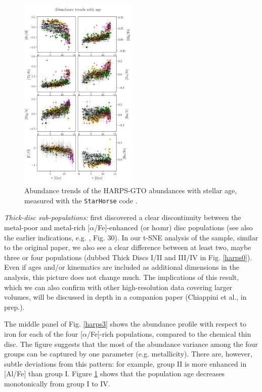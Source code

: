 \documentclass{aa}  %
\begin{document}
\begin{figure}\centering
 \includegraphics[width=0.5\textwidth]{im/harps_tsne-age-abundsplot_teffcut.png}
\caption{Abundance trends of the HARPS-GTO abundances with stellar age, measured with the \texttt{StarHorse} code \citep{Queiroz2018}.}
\label{age}
\end{figure}

{\it Thick-disc sub-populations:} \citet{Adibekyan2011} first discovered a clear discontinuity between the metal-poor and metal-rich $[\alpha$/Fe]-enhanced (or h$\alpha$mr) disc populations (see also the earlier indications, e.g. \citealt{Fuhrmann2008}, Fig. 30). In our t-SNE analysis of the \citet{DelgadoMena2017} sample, similar to the original paper, we also see a clear difference between at least two, maybe three or four populations (dubbed Thick Discs I/II and III/IV in Fig. \ref{harps0}). Even if ages and/or kinematics are included as additional dimensions in the analysis, this picture does not change much. The implications of this result, which we can also confirm with other high-resolution data covering larger volumes, will be discussed in depth in a companion paper (Chiappini et al., in prep.).

The middle panel of Fig. \ref{harps3} shows the abundance profile with respect to iron for each of the four [$\alpha$/Fe]-rich populations, compared to the chemical thin disc. The figure suggests that the most of the abundance variance among the four groups can be captured by one parameter (e.g. metallicity). There are, however, subtle deviations from this pattern: for example, group II is more enhanced in [Al/Fe] than group I. Figure \ref{age} shows that the population age decreases monotonically from group I to IV. 
\end{document}
